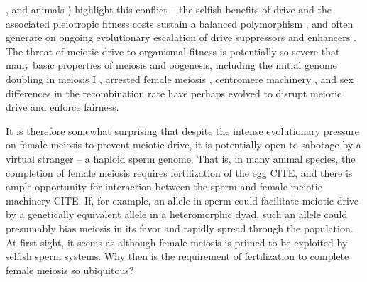 \documentclass[12pt,letterpaper]{article}
\newcommand{\yb}[1]{{ \color{blue} #1}}
\begin{document}
\citep{Buckler1999,Fishman2005,Fishman2008}, and animals
\citep{Agulnik1990,Wu2005,Pardo-ManuelDeVillena2001c}) highlight this
conflict -- the selfish benefits of drive and the associated
pleiotropic fitness costs sustain a balanced polymorphism
\citep{Prout1973}, 
and often generate on ongoing evolutionary escalation of drive suppressors and enhancers \citep{Dawe1996,Fishman2008}. 
The threat of meiotic drive to organismal fitness is potentially so
severe that many basic properties of
meiosis and o\"{o}genesis, including the initial genome doubling in
meiosis I \citep{Haig1991}, arrested female meiosis
\citep{Mira1998}, centromere machinery \citep{MalikHenikoff}, and sex differences in the recombination rate \citep{Haig2010,Brandvain2012} 
have perhaps evolved to disrupt meiotic drive and enforce fairness. 

It is therefore somewhat surprising that despite the intense evolutionary pressure on female meiosis to prevent meiotic drive, 
it is potentially open to sabotage by a virtual stranger -- a haploid sperm genome.
That is, in many animal species, the completion of female meiosis requires fertilization of the egg \yb{CITE}, 
and there is ample opportunity for interaction between the sperm and female meiotic machinery \yb{CITE}.
If, for example, an allele in sperm could facilitate meiotic drive by a genetically equivalent allele in a 
heteromorphic dyad, such an allele could presumably bias meiosis in its favor and rapidly spread through the population.
At first sight, it seems as although female meiosis is primed to be exploited by selfish sperm systems.  
\yb{Why then is the requirement of fertilization to complete female meiosis so ubiquitous? }

\end{document}
